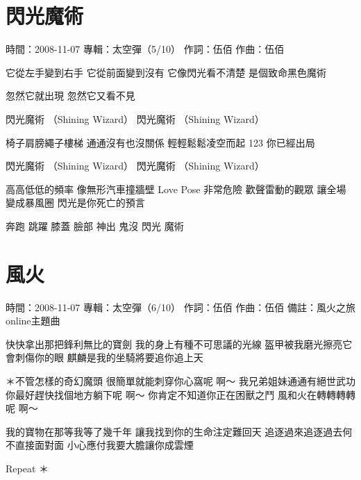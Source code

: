 \documentclass[UTF8,a4paper,oneside,twocolumn,12pt]{ctexbook}
\newcommand{\infopair}[2]{\textbullet #1：#2}
\newcommand{\zc}[1][伍佰]{\infopair{作詞}{#1}}
\newcommand{\zq}[1][伍佰]{\infopair{作曲}{#1}}
\newcommand{\zj}[1]{\infopair{專輯}{#1}}
\newcommand{\sj}[1]{\infopair{時間}{#1}}
\newcommand{\bz}[1]{\infopair{備註}{#1}}
\newenvironment{info}{\begin{flushleft}\kaishu
	}
	{\end{flushleft}\normalsize\yahei\par}
\newenvironment{lyric}{
	}
{}
\begin{document}
\section{閃光魔術}
\begin{info}
	\sj{2008-11-07}
	\zj{太空彈（5/10）}
	\zc
	\zq
\end{info}
\begin{lyric}
	它從左手變到右手
	它從前面變到沒有
	它像閃光看不清楚
	是個致命黑色魔術

	忽然它就出現
	忽然它又看不見

	閃光魔術 （Shining Wizard）
	閃光魔術 （Shining Wizard）

	椅子肩膀繩子樓梯
	通通沒有也沒關係
	輕輕鬆鬆凌空而起
	123 你已經出局

	閃光魔術 （Shining Wizard）
	閃光魔術 （Shining Wizard）

	高高低低的頻率 像無形汽車撞牆壁
	Love Pose 非常危險
	歡聲雷動的觀眾 讓全場變成暴風圈
	閃光是你死亡的預言

	奔跑 跳躍 膝蓋 臉部
	神出 鬼沒 閃光 魔術
\end{lyric}

\section{風火}
\begin{info}
	\sj{2008-11-07}
	\zj{太空彈（6/10）}
	\zc
	\zq
	\bz{風火之旅online主題曲}
\end{info}
\begin{lyric}
	快快拿出那把鋒利無比的寶劍
	我的身上有種不可思議的光線
	盔甲被我磨光擦亮它會刺傷你的眼
	麒麟是我的坐騎將要追你追上天

	＊不管怎樣的奇幻魔頭
	很簡單就能刺穿你心窩呢 啊～
	我兄弟姐妹通通有絕世武功
	你最好趕快找個地方躺下呢 啊～
	你肯定不知道你正在困獸之鬥
	風和火在轉轉轉轉呢 啊～

	我的寶物在那等我等了幾千年
	讓我找到你的生命注定難回天
	追逐過來追逐過去何不直接面對面
	小心應付我要大膽讓你成雲煙

	Repeat ＊
\end{lyric}
\end{document}
